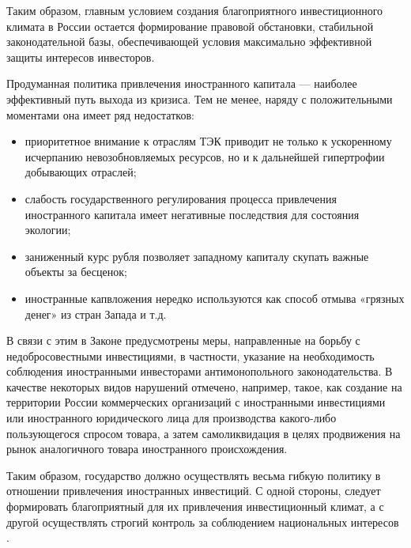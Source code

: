 Таким образом, главным условием создания благоприятного инвестиционного климата в России остается формирование правовой обстановки, стабильной законодательной базы, обеспечивающей условия максимально эффективной защиты интересов инвесторов.

Продуманная политика привлечения иностранного капитала  --- наиболее эффективный путь выхода из кризиса. Тем не менее, наряду с положительными моментами она имеет ряд недостатков:
\begin{itemize}
	\item приоритетное внимание к отраслям ТЭК приводит не только к ускоренному исчерпанию невозобновляемых ресурсов, но и к дальнейшей гипертрофии добывающих отраслей;
\item слабость государственного регулирования процесса привлечения иностранного капитала имеет негативные последствия для состояния экологии;
\item заниженный курс рубля позволяет западному капиталу скупать важные объекты за бесценок;
\item иностранные капвложения нередко используются как способ отмыва «грязных денег» из стран Запада и т.д.
\end{itemize}

В связи с этим в Законе предусмотрены меры, направленные на борьбу с недобросовестными инвестициями, в частности, указание на необходимость соблюдения иностранными инвесторами антимонопольного законодательства. В качестве некоторых видов нарушений отмечено, например, такое, как создание на территории России коммерческих организаций с иностранными инвестициями или иностранного юридического лица для производства какого-либо пользующегося спросом товара, а затем самоликвидация в целях продвижения на рынок аналогичного товара иностранного происхождения.

Таким образом, государство должно осуществлять весьма гибкую политику в отношении привлечения иностранных инвестиций. С одной стороны, следует формировать благоприятный для их привлечения инвестиционный климат, а с другой   осуществлять строгий контроль за соблюдением национальных интересов \cite{02}.